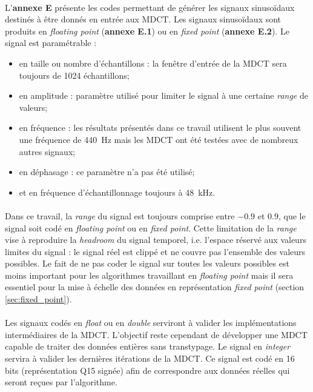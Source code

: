\documentclass{article}
\begin{document}
    \paragraph{}
    L'\textbf{annexe E} présente les codes permettant de générer les signaux sinusoïdaux destinés à être donnés en entrée aux MDCT. Les signaux sinusoïdaux sont produits en \emph{floating point} (\textbf{annexe E.1}) ou en \emph{fixed point} (\textbf{annexe E.2}). Le signal est paramétrable :
    \begin{itemize}
        \item en taille ou nombre d'échantillons : la fenêtre d'entrée de la MDCT sera toujours de 1024 échantillons;
        \item en amplitude : paramètre utilisé pour limiter le signal à une certaine \emph{range} de valeurs;
        \item en fréquence : les résultats présentés dans ce travail utilisent le plus souvent une fréquence de \SI{440}{\hertz} mais les MDCT ont été testées avec de nombreux autres signaux;
        \item en déphasage : ce paramètre n'a pas été utilisé;
        \item et en fréquence d'échantillonnage toujours à \SI{48}{\kilo\hertz}.
    \end{itemize}

    \paragraph{}
    Dans ce travail, la \emph{range} du signal est toujours comprise entre $-0.9$ et $0.9$, que le signal soit codé en \emph{floating point} ou en \emph{fixed point}. Cette limitation de la \emph{range} vise à reproduire la \emph{headroom} du signal temporel, i.e. l'espace réservé aux valeurs limites du signal : le signal réel est clippé et ne couvre pas l'ensemble des valeurs possibles. Le fait de ne pas coder le signal sur toutes les valeurs possibles est moins important pour les algorithmes travaillant en \emph{floating point} mais il sera essentiel pour la mise à échelle des données en représentation \emph{fixed point} (section \ref{sec:fixed_point}).

    \paragraph{}
    Les signaux codés en \emph{float} ou en \emph{double} serviront à valider les implémentations intermédiaires de la MDCT. L'objectif reste cependant de développer une MDCT capable de traiter des données entières sans transtypage. Le signal en \emph{integer} servira à valider les dernières itérations de la MDCT. Ce signal est codé en 16 bits (représentation Q15 signée) afin de correspondre aux données réelles qui seront reçues par l'algorithme.
\end{document}
